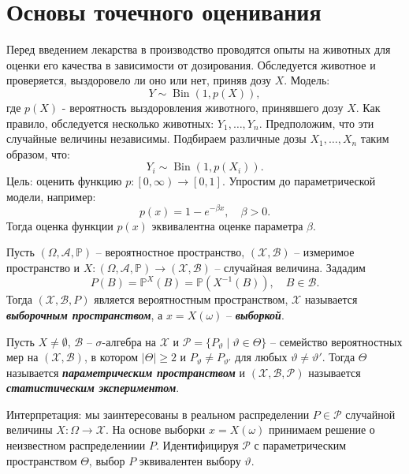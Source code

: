 \graphicspath{{./chapters/chapter02/}}
\chapter{Основы точечного оценивания}

\begin{exmp}
	Перед введением лекарства в производство проводятся опыты на животных для оценки его качества в зависимости от дозирования. Обследуется животное и проверяется, выздоровело ли оно или нет, приняв дозу $X$. Модель:
	\[Y \sim \operatorname{Bin}(1, p(X)),\]
	где $p(X)$ - вероятность выздоровления животного, принявшего дозу $X$.
	Как правило, обследуется несколько животных: $Y_1, \dots, Y_n$. Предположим, что эти случайные величины независимы. Подбираем различные дозы $X_1, \dots, X_n$ таким образом, что:
	\[Y_i \sim \operatorname{Bin}(1,p(X_i)). \]
	Цель: оценить функцию $p: \left[0, \infty \right) \rightarrow [0, 1]$. Упростим до параметрической модели, например: \[p(x)=1-e^{-\beta x}, \quad \beta>0 .\]
	Тогда оценка функции $p(x)$ эквивалентна оценке параметра $\beta$.
\end{exmp}

\begin{asmp}
	Пусть $(\Omega, \mathcal{A}, \mathbb{P})$ -- вероятностное пространство, $(\mathcal{X}, \mathcal{B})$ -- измеримое пространство и $X\colon(\Omega, \mathcal{A}, \mathbb{P}) \rightarrow (\mathcal{X}, \mathcal{B})$ -- случайная величина. Зададим
	\[P(B)=\mathbb{P}^X(B)=\mathbb{P}(X^{-1}(B)), \quad B \in \mathcal{B}.  \]
	Тогда $(\mathcal{X}, \mathcal{B}, P)$ является вероятностным пространством, $\mathcal{X}$ называется \textbf{\textit{выборочным пространством}}, а $x=X(\omega)$ -- \textbf{\textit{выборкой}}. 
\end{asmp}

\begin{defn}
	Пусть $X \neq \emptyset$, $\mathcal{B}$ -- $\sigma$-алгебра на $\mathcal{X}$ и $\mathcal{P}=\{P_\vartheta \mid \vartheta \in \Theta \}$ -- семейство вероятностных мер на $(\mathcal{X}, \mathcal{B})$, в котором $|\Theta| \geq 2$ и $P_\vartheta \neq P_{\vartheta'}$ для любых $\vartheta \neq \vartheta'$. Тогда $\Theta$ называется \textbf{\textit{параметрическим пространством}} и $(\mathcal{X}, \mathcal{B}, \mathcal{P})$ называется \textbf{\textit{статистическим экспериментом}}.
\end{defn}

\begin{rmrk}
	Интерпретация: мы заинтересованы в реальном распределении $P \in \mathcal{P}$ случайной величины $X\colon\Omega \rightarrow \mathcal{X}.$ На основе выборки $x=X(\omega)$ принимаем решение о неизвестном распределениии $P$. Идентифицируя $\mathcal{P}$ с параметрическим пространством $\Theta$, выбор $P$ эквивалентен выбору $\vartheta$.
	
\end{rmrk}

